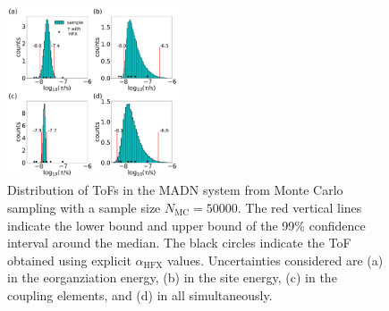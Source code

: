 \documentclass[%
 reprint,
superscriptaddress,
 amsmath,amssymb,
 aps,
prb,
floatfix
]{revtex4-2}
\newcommand{\ahfx}{\ensuremath{\alpha_\text{HFX}}\xspace}
\begin{document}


\begin{figure}[tbp]
  \centering
  \includegraphics[width=0.45\textwidth]{figs/fig_mle_MADN_withE.pdf}
  \caption{Distribution of ToFs in the MADN system from  Monte Carlo sampling with a sample size $N_\text{MC}=50000$. The red vertical lines indicate the lower bound and upper bound of the 99\% confidence interval around the median. The black circles indicate the ToF obtained using explicit \ahfx values. Uncertainties considered are (a) in the eorganziation energy, (b) in the site energy, (c) in the coupling elements, and (d) in all simultaneously.}
  \label{fig:mle_MADN_withE}
\end{figure}
\end{document}
